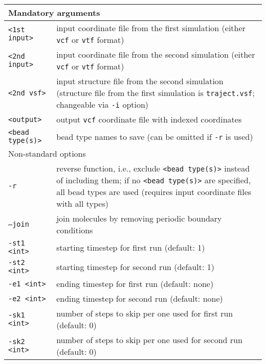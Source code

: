 \vspace{1em}
\noindent
\begin{longtable}{p{}p{}}
  \toprule
  \multicolumn{2}{l}{Mandatory arguments} \\
  \midrule
  \texttt{<1st input>} & input coordinate file from the first simulation (either \texttt{vcf} or
    \texttt{vtf} format) \\
  \texttt{<2nd input>} & input coordinate file from the second simulation (either \texttt{vcf} or
    \texttt{vtf} format) \\
  \texttt{<2nd vsf>} & input structure file from the second simulation
    (structure file from the first simulation is \texttt{traject.vsf};
    changeable via \texttt{-i} option) \\
  \texttt{<output>} & output \texttt{vcf} coordinate file with indexed
    coordinates \\
  \texttt{<bead type(s)>} & bead type names to save (can be omitted if
    \texttt{-r} is used)\\
  \toprule
  \multicolumn{2}{l}{Non-standard options} \\
  \midrule
  \texttt{-r} & reverse function, i.e., exclude \texttt{<bead type(s)>}
    instead of including them; if no \texttt{<bead type(s)>} are specified,
    all bead types are used (requires input coordinate files with all types) \\
  \texttt{--join} & join molecules by removing periodic boundary conditions \\
  \texttt{-st1 <int>} & starting timestep for first run (default: 1) \\
  \texttt{-st2 <int>} & starting timestep for second run (default: 1) \\
  \texttt{-e1 <int>} & ending timestep for first run (default: none) \\
  \texttt{-e2 <int>} & ending timestep for second run (default: none) \\
  \texttt{-sk1 <int>} & number of steps to skip per one used for first run (default: 0) \\
  \texttt{-sk2 <int>} & number of steps to skip per one used for second run (default: 0) \\
  \bottomrule
\end{longtable}
